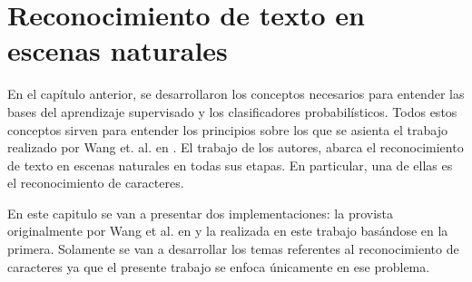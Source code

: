 \newpage	
\section{Reconocimiento de texto en escenas naturales}

	En el capítulo anterior, se desarrollaron los conceptos necesarios para entender las bases del aprendizaje supervisado y los clasificadores probabilísticos. Todos estos conceptos sirven para entender los principios sobre los que se asienta el trabajo realizado por Wang et. al. en \cite{wang}. El trabajo de los autores, abarca el reconocimiento de texto en escenas naturales en todas sus etapas. En particular, una de ellas es el reconocimiento de caracteres.
	
	En este capitulo se van a presentar dos implementaciones: la provista originalmente por Wang et al. en \cite{wang} y la realizada en este trabajo basándose en la primera. Solamente se van a desarrollar los temas referentes al reconocimiento de caracteres ya que el presente trabajo se enfoca únicamente en ese problema.
	
	
		
	
	
	
	
	
	
